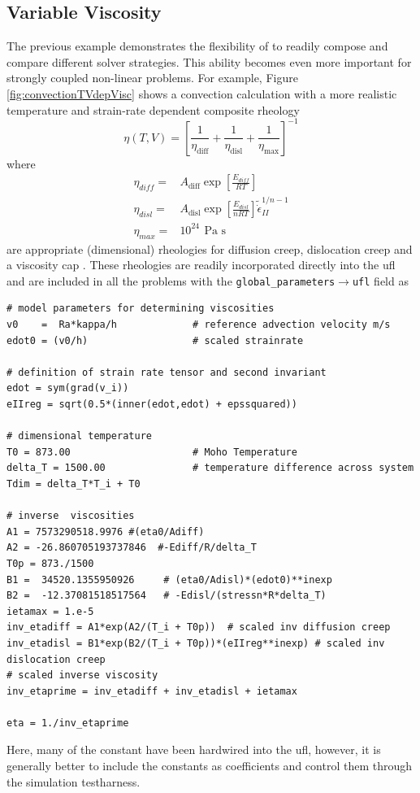 \subsection{Variable Viscosity}
\label{sec:variable-viscosity}

The previous example demonstrates the flexibility of \TF{} to readily
compose and compare different solver strategies.  This ability becomes
even more important for strongly coupled non-linear problems.  For
example, Figure \ref{fig:convectionTVdepVisc} shows a convection
calculation with a more realistic temperature and strain-rate
dependent composite rheology
\begin{equation}
  \label{eq:4.10}
  \eta(T,V) =
  \left[
\frac{1}{\eta_{\text{diff}}} + \frac{1}{\eta_{\text{disl}}} + \frac{1}{\eta_{\text{max}}}
  \right]^{-1}
\end{equation}
where
\begin{align}
  \label{eq:4.11}
  \eta_{diff} = &A_{\text{diff}}\exp
  \left[
\frac{E_{diff}}{RT}
  \right]\\
\eta_{disl} =& A_{\text{disl}}\exp
\left[
\frac{E_{disl}}{nRT}
\right]\tilde{\dot{\epsilon}}_{II}^{1/n -1}\\
\eta_{max} =& 10^{24} ~\mathrm{\,Pa\,\, s}
\end{align}
are appropriate (dimensional) rheologies for diffusion creep,
dislocation creep and a viscosity cap \cite{billen_rheologic_2007}.
These rheologies are readily incorporated directly into the ufl and
are included in all the problems with the
\texttt{global\_parameters}$\rightarrow$\texttt{ufl} field as
\begin{lstlisting}[style=ufl]
# model parameters for determining viscosities
v0    =  Ra*kappa/h             # reference advection velocity m/s
edot0 = (v0/h)                  # scaled strainrate

# definition of strain rate tensor and second invariant
edot = sym(grad(v_i))
eIIreg = sqrt(0.5*(inner(edot,edot) + epssquared))

# dimensional temperature
T0 = 873.00                     # Moho Temperature
delta_T = 1500.00               # temperature difference across system
Tdim = delta_T*T_i + T0          

# inverse  viscosities
A1 = 7573290518.9976 #(eta0/Adiff)
A2 = -26.860705193737846  #-Ediff/R/delta_T
T0p = 873./1500
B1 =  34520.1355950926     # (eta0/Adisl)*(edot0)**inexp
B2 =  -12.37081518517564   # -Edisl/(stressn*R*delta_T)
ietamax = 1.e-5
inv_etadiff = A1*exp(A2/(T_i + T0p))  # scaled inv diffusion creep
inv_etadisl = B1*exp(B2/(T_i + T0p))*(eIIreg**inexp) # scaled inv dislocation creep
# scaled inverse viscosity
inv_etaprime = inv_etadiff + inv_etadisl + ietamax

eta = 1./inv_etaprime
\end{lstlisting}
Here, many of the constant have been hardwired into the ufl, however,
it is generally better to include the constants as coefficients and
control them through the simulation testharness.


